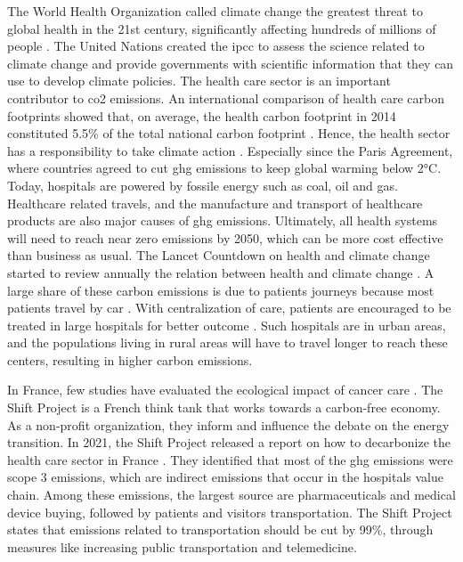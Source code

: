 The World Health Organization called climate change the greatest threat to global health in the 21st century, significantly affecting hundreds of millions of people \cite{change_climate_2015}. The United Nations created the \ac{ipcc} to assess the science related to climate change and provide governments with scientific information that they can use to develop climate policies.
The health care sector is an important contributor to \ac{co2} emissions. An international comparison of health care carbon footprints showed that, on average, the health carbon footprint in 2014 constituted 5.5\% of the total national carbon footprint \cite{pichler_international_2019}. Hence, the health sector has a responsibility to take climate action \cite{health_care_without_harm_hcwh_global_2021}. Especially since the Paris Agreement, where countries agreed to cut \ac{ghg} emissions to keep global warming below 2°C. Today, hospitals are powered by fossile energy such as coal, oil and gas. Healthcare related travels, and the manufacture and transport of healthcare products are also major causes of \ac{ghg} emissions. Ultimately, all health systems will need to reach near zero emissions by 2050, which can be more cost effective than business as usual. The Lancet Countdown on health and climate change started to review annually the relation between health and climate change \cite{watts_2020_2021}. A large share of these carbon emissions is due to patients journeys \cite{andrews_carbon_2013,nicolet_what_2022} because most patients travel by car \cite{forner_carbon_2021}. With centralization of care, patients are encouraged to be treated in large hospitals for better outcome \cite{eskander_health_2016}. Such hospitals are in urban areas, and the populations living in rural areas will have to travel longer to reach these centers, resulting in higher carbon emissions.

In France, few studies have evaluated the ecological impact of cancer care \cite{guillon_empreinte_2020}. The Shift Project is a French think tank that works towards a carbon-free economy. As a non-profit organization, they inform and influence the debate on the energy transition. In 2021, the Shift Project released a report on how to decarbonize the health care sector in France \cite{the_shift_project_plan_2021}. They identified that most of the \ac{ghg} emissions were scope 3 emissions, which are indirect emissions that occur in the hospitals value chain. Among these emissions, the largest source are pharmaceuticals and medical device buying, followed by patients and visitors transportation. The Shift Project states that emissions related to transportation should be cut by 99\%, through measures like increasing public transportation and telemedicine.

